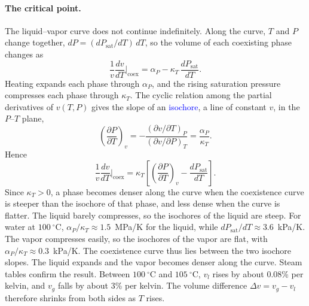 \paragraph{The critical point.}
The liquid--vapor curve does not continue indefinitely. Along the curve,
$T$ and $P$ change together, $dP=(dP_{\text{sat}}/dT)\,dT$, so the volume
of each coexisting phase changes as
\begin{equation}
    \boxed{\frac{1}{v}\frac{dv}{dT}\bigg|_{\text{coex}}
    =\alpha_P-\kappa_T\,\frac{dP_{\text{sat}}}{dT}.}
\end{equation}
Heating expands each phase through $\alpha_P$, and the rising saturation
pressure compresses each phase through $\kappa_T$. The cyclic relation
among the partial derivatives of $v(T,P)$ gives the slope of an
\textcolor{blue}{isochore}, a line of constant $v$, in the $P$--$T$ plane,
\begin{equation}
    \left(\frac{\partial P}{\partial T}\right)_{\!v}
    =-\frac{(\partial v/\partial T)_P}{(\partial v/\partial P)_T}
    =\frac{\alpha_P}{\kappa_T}.
\end{equation}
Hence
\begin{equation}
    \boxed{\frac{1}{v}\frac{dv}{dT}\bigg|_{\text{coex}}
    =\kappa_T\left[\left(\frac{\partial P}{\partial T}\right)_{\!v}
    -\frac{dP_{\text{sat}}}{dT}\right].}
\end{equation}
Since $\kappa_T>0$, a phase becomes denser along the curve when the
coexistence curve is steeper than the isochore of that phase, and less dense
when the curve is flatter. The liquid barely compresses, so the isochores of
the liquid are steep. For water at $100~^\circ$C,
$\alpha_P/\kappa_T\approx1.5$~MPa/K for the liquid, while
$dP_{\text{sat}}/dT\approx3.6$~kPa/K. The vapor compresses easily, so the
isochores of the vapor are flat, with $\alpha_P/\kappa_T\approx0.3$~kPa/K.
The coexistence curve thus lies between the two isochore slopes. The liquid
expands and the vapor becomes denser along the curve. Steam tables confirm
the result. Between $100~^\circ$C and $105~^\circ$C, $v_l$ rises by about
0.08\% per kelvin, and $v_g$ falls by about 3\% per kelvin. The volume
difference $\Delta v=v_g-v_l$ therefore shrinks from both sides as $T$
rises.

